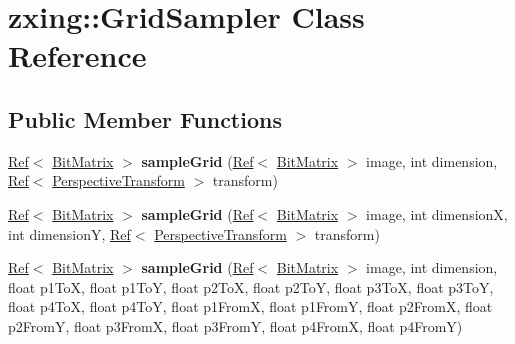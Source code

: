 \hypertarget{classzxing_1_1_grid_sampler}{}\section{zxing\+:\+:Grid\+Sampler Class Reference}
\label{classzxing_1_1_grid_sampler}
\subsection*{Public Member Functions}
\begin{DoxyCompactItemize}
\item 
\mbox{\label{classzxing_1_1_grid_sampler_a350d04526fd56ce3feee915168260758}} 
\mbox{\hyperlink{classzxing_1_1_ref}{Ref}}$<$ \mbox{\hyperlink{classzxing_1_1_bit_matrix}{Bit\+Matrix}} $>$ {\bfseries sample\+Grid} (\mbox{\hyperlink{classzxing_1_1_ref}{Ref}}$<$ \mbox{\hyperlink{classzxing_1_1_bit_matrix}{Bit\+Matrix}} $>$ image, int dimension, \mbox{\hyperlink{classzxing_1_1_ref}{Ref}}$<$ \mbox{\hyperlink{classzxing_1_1_perspective_transform}{Perspective\+Transform}} $>$ transform)
\item 
\mbox{\label{classzxing_1_1_grid_sampler_ad3f5975ffb2646a7a519ea397bdb0775}} 
\mbox{\hyperlink{classzxing_1_1_ref}{Ref}}$<$ \mbox{\hyperlink{classzxing_1_1_bit_matrix}{Bit\+Matrix}} $>$ {\bfseries sample\+Grid} (\mbox{\hyperlink{classzxing_1_1_ref}{Ref}}$<$ \mbox{\hyperlink{classzxing_1_1_bit_matrix}{Bit\+Matrix}} $>$ image, int dimensionX, int dimensionY, \mbox{\hyperlink{classzxing_1_1_ref}{Ref}}$<$ \mbox{\hyperlink{classzxing_1_1_perspective_transform}{Perspective\+Transform}} $>$ transform)
\item 
\mbox{\label{classzxing_1_1_grid_sampler_a6b4d98e207d407df7661ab5b38e22049}} 
\mbox{\hyperlink{classzxing_1_1_ref}{Ref}}$<$ \mbox{\hyperlink{classzxing_1_1_bit_matrix}{Bit\+Matrix}} $>$ {\bfseries sample\+Grid} (\mbox{\hyperlink{classzxing_1_1_ref}{Ref}}$<$ \mbox{\hyperlink{classzxing_1_1_bit_matrix}{Bit\+Matrix}} $>$ image, int dimension, float p1\+ToX, float p1\+ToY, float p2\+ToX, float p2\+ToY, float p3\+ToX, float p3\+ToY, float p4\+ToX, float p4\+ToY, float p1\+FromX, float p1\+FromY, float p2\+FromX, float p2\+FromY, float p3\+FromX, float p3\+FromY, float p4\+FromX, float p4\+FromY)
\end{DoxyCompactItemize}

